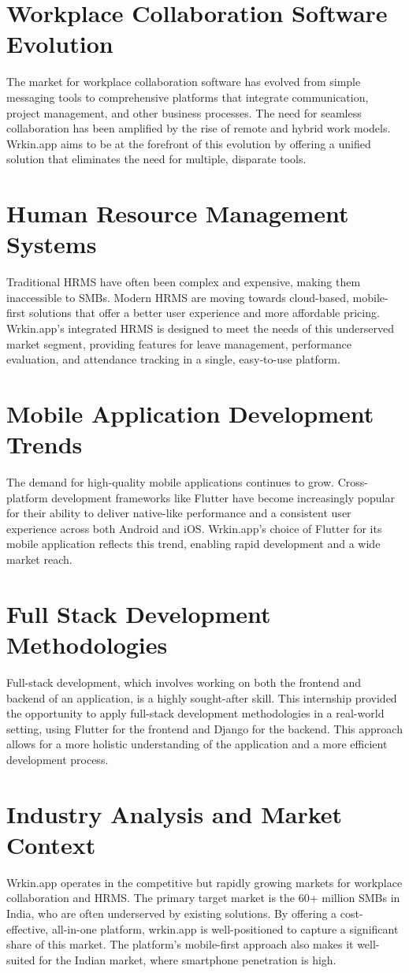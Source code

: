 \section{Workplace Collaboration Software Evolution}
The market for workplace collaboration software has evolved from simple messaging tools to comprehensive platforms that integrate communication, project management, and other business processes. The need for seamless collaboration has been amplified by the rise of remote and hybrid work models. Wrkin.app aims to be at the forefront of this evolution by offering a unified solution that eliminates the need for multiple, disparate tools.

\section{Human Resource Management Systems}
Traditional HRMS have often been complex and expensive, making them inaccessible to SMBs. Modern HRMS are moving towards cloud-based, mobile-first solutions that offer a better user experience and more affordable pricing. Wrkin.app's integrated HRMS is designed to meet the needs of this underserved market segment, providing features for leave management, performance evaluation, and attendance tracking in a single, easy-to-use platform.

\section{Mobile Application Development Trends}
The demand for high-quality mobile applications continues to grow. Cross-platform development frameworks like Flutter have become increasingly popular for their ability to deliver native-like performance and a consistent user experience across both Android and iOS. Wrkin.app's choice of Flutter for its mobile application reflects this trend, enabling rapid development and a wide market reach.

\section{Full Stack Development Methodologies}
Full-stack development, which involves working on both the frontend and backend of an application, is a highly sought-after skill. This internship provided the opportunity to apply full-stack development methodologies in a real-world setting, using Flutter for the frontend and Django for the backend. This approach allows for a more holistic understanding of the application and a more efficient development process.

\section{Industry Analysis and Market Context}
Wrkin.app operates in the competitive but rapidly growing markets for workplace collaboration and HRMS. The primary target market is the 60+ million SMBs in India, who are often underserved by existing solutions. By offering a cost-effective, all-in-one platform, wrkin.app is well-positioned to capture a significant share of this market. The platform's mobile-first approach also makes it well-suited for the Indian market, where smartphone penetration is high.
